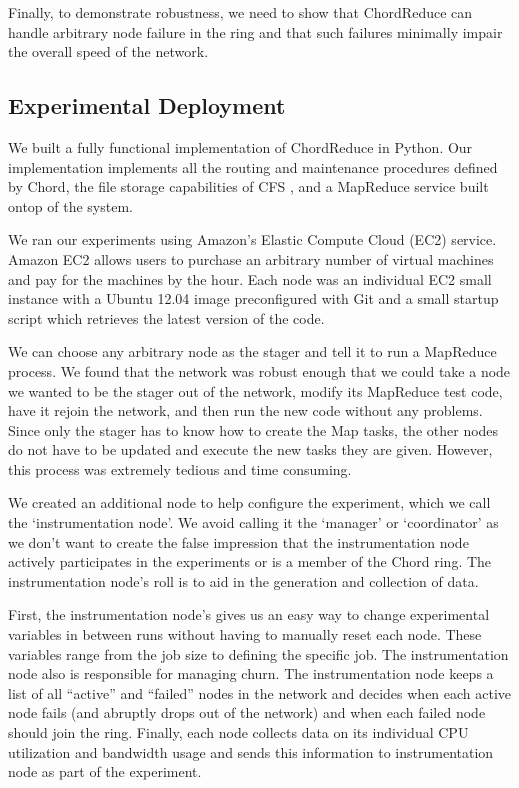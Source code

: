 Finally, to demonstrate robustness, we need to show that ChordReduce can handle arbitrary node failure in the ring and that such failures minimally impair the overall speed of the network.

\subsection{Experimental Deployment}
We built a fully functional implementation of ChordReduce in Python.  Our implementation implements all the routing and maintenance procedures defined by Chord\cite{chord}, the file storage capabilities of CFS \cite{CFS}, and a MapReduce service built ontop of the system.    %

We ran our experiments using Amazon's Elastic Compute Cloud (EC2) service.  Amazon EC2 allows users to purchase an arbitrary number of virtual machines and pay for the machines by the hour. Each node was an individual EC2 small instance \cite{amazon-instances} with a Ubuntu 12.04 image preconfigured with Git and a small startup script which retrieves the latest version of the code.

We can choose any arbitrary node as the stager and tell it to run a MapReduce process. We found that the network was robust enough that we could take a node we wanted to be the stager out of the network, modify its MapReduce test code, have it rejoin the network, and then run the new code without any problems. Since only the stager has to know how to create the Map tasks, the other nodes do not have to be updated and execute the new tasks they are given.  However, this process was extremely tedious and time consuming.

We created an additional node to help configure the experiment, which we call the `instrumentation node'.  We avoid calling it the `manager' or `coordinator' as we don't want to create the false impression that the instrumentation node actively participates in the experiments or is a member of the Chord ring.  The instrumentation node's roll is to aid in the generation and collection of data. 

First, the instrumentation node's gives us an easy way to change experimental variables in between runs without having to manually reset each node. These variables range from the job size to defining the specific job.  The instrumentation node also is responsible for managing churn.  The instrumentation node keeps a list of all ``active'' and ``failed'' nodes in the network and decides when each active node fails (and abruptly drops out of the network) and when each failed node should join the ring.  Finally, each node collects data on its individual CPU utilization and bandwidth usage and sends this information to instrumentation node as part of the experiment. 

